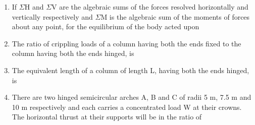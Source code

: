\documentclass[11pt,a4paper]{article}
\begin{document}
\begin{enumerate}
\item{If $\Sigma$H and $\Sigma$V are the algebraic sums of the forces resolved horizontally and vertically respectively and $\Sigma$M is the algebraic sum of the moments of forces about any point, for the equilibrium of the body acted upon}
\\
\item{The ratio of crippling loads of a column having both the ends fixed to the column having both the ends hinged, is}
\\
\item{The equivalent length of a column of length L, having both the ends hinged, is}
\\
\item{There are two hinged semicircular arches A, B and C of radii 5 m, 7.5 m and 10 m respectively and each carries a concentrated load W at their crowns. The horizontal thrust at their supports will be in the ratio of}
\\
\end{enumerate}
\end{document}

